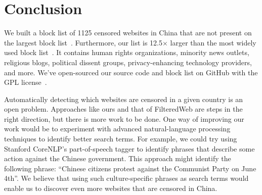 
\section{Conclusion}
We built a block list of 1125 censored websites in China that are not
present on the largest block
list~\cite{darer2017filteredweb}. Furthermore, our list is 12.5$\times$
larger than the most widely used block
list~\cite{citizenlab:block}. It contains human rights organizations,
minority news outlets, religious blogs, political dissent groups,
privacy-enhancing technology providers, and more. We've open-sourced
our source code and block list on GitHub with the GPL
license~\cite{censorsearch-lists}.

Automatically detecting which websites are censored in a given country is an
open problem. Approaches like ours and that of FilteredWeb are steps in the
right direction, but there is more work to be done.  One way of improving
our work would be to experiment with advanced natural-language processing
techniques to identify better search terms. For example, we could try using
Stanford CoreNLP's part-of-speech tagger to identify phrases that describe
some action against the Chinese government. This approach might
identify the following phrase: ``Chinese citizens protest against the Communist Party on June
4th''. We believe that using such culture-specific phrases as search terms
would enable us to discover even more websites that are censored in China.

